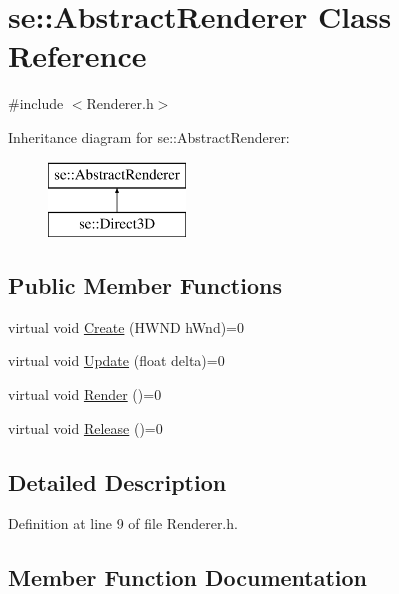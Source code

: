 \hypertarget{classse_1_1_abstract_renderer}{}\section{se\+:\+:Abstract\+Renderer Class Reference}
\label{classse_1_1_abstract_renderer}


{\ttfamily \#include $<$Renderer.\+h$>$}

Inheritance diagram for se\+:\+:Abstract\+Renderer\+:\begin{figure}[H]
\begin{center}
\leavevmode
\includegraphics[height=2.000000cm]{classse_1_1_abstract_renderer}
\end{center}
\end{figure}
\subsection*{Public Member Functions}
\begin{DoxyCompactItemize}
\item 
virtual void \mbox{\hyperlink{classse_1_1_abstract_renderer_afdfce8b91028448c17ce27550827f192}{Create}} (H\+W\+ND h\+Wnd)=0
\item 
virtual void \mbox{\hyperlink{classse_1_1_abstract_renderer_aae49e7417663d6a5aca34a2bb37b4b28}{Update}} (float delta)=0
\item 
virtual void \mbox{\hyperlink{classse_1_1_abstract_renderer_a08f813c33edad06bf7d379f8257895e6}{Render}} ()=0
\item 
virtual void \mbox{\hyperlink{classse_1_1_abstract_renderer_a98e35b7db62827580573185ed91b25bb}{Release}} ()=0
\end{DoxyCompactItemize}


\subsection{Detailed Description}


Definition at line 9 of file Renderer.\+h.



\subsection{Member Function Documentation}
\mbox{\label{classse_1_1_abstract_renderer_afdfce8b91028448c17ce27550827f192}} 
